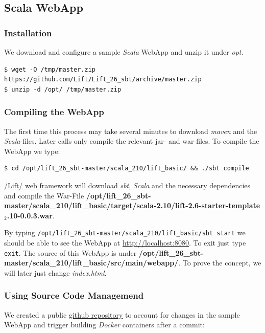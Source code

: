 \documentclass[11pt]{article}
\begin{document}
\subsection{Scala WebApp}
\label{sec-4-3}
\subsubsection{Installation}
\label{sec-4-3-1}

We download and configure a sample \emph{Scala} WebApp and unzip it under \emph{opt}.

\begin{verbatim}
$ wget -O /tmp/master.zip https://github.com/Lift/Lift_26_sbt/archive/master.zip
$ unzip -d /opt/ /tmp/master.zip
\end{verbatim}
\subsubsection{Compiling the WebApp}
\label{sec-4-3-2}

The first time this process may take several minutes to download \emph{maven} and the \emph{Scala}-files. Later calls only compile the relevant jar- and war-files. To compile the WebApp we type:

\begin{verbatim}
$ cd /opt/lift_26_sbt-master/scala_210/lift_basic/ && ./sbt compile
\end{verbatim}

\href{http:///Lift/web.net/getting_started}{/Lift/ web framework}  will download \emph{sbt}, \emph{Scala} and the necessary dependencies and compile the War-File \textbf{/opt/lift\_26\_sbt-master/scala\_210/lift\_basic/target/scala-2.10/lift-2.6-starter-template$_2$.10-0.0.3.war}. 
 
By typing \texttt{/opt/lift\_26\_sbt-master/scala\_210/lift\_basic/sbt  start} we should be able to see the WebApp at \href{http://localhost:8080}{http://localhost:8080}. To exit just type \texttt{exit}. The source of this WebApp is under \textbf{/opt/lift\_26\_sbt-master/scala\_210/lift\_basic/src/main/webapp/}. To prove the concept, we will later just change \emph{index.html}.
\subsubsection{Using Source Code Managemend}
\label{sec-4-3-3}

We created a public  \href{https://github.com/radiomix/scala-basic.git}{github repository} to account for changes in the sample WebApp and trigger building \emph{Docker} containers after a commit:
\end{document}
